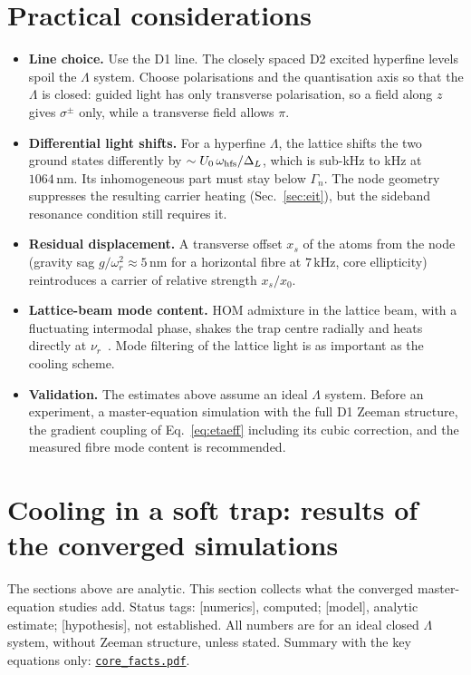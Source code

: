 \documentclass[11pt,a4paper]{article}
\newcommand{\SI}[2]{\ensuremath{#1\,\mathrm{#2}}}
\begin{document}
\section{Practical considerations}
\label{sec:practical}
\begin{itemize}
\item \textbf{Line choice.} Use the D1 line. The closely spaced D2 excited hyperfine levels spoil the $\Lambda$ system. Choose polarisations and the quantisation axis so that the $\Lambda$ is closed: guided light has only transverse polarisation, so a field along $z$ gives $\sigma^\pm$ only, while a transverse field allows $\pi$.
\item \textbf{Differential light shifts.} For a hyperfine $\Lambda$, the lattice shifts the two ground states differently by $\sim U_0\,\omega_{\rm hfs}/\Delta_L$, which is sub-kHz to kHz at \SI{1064}{nm}. Its inhomogeneous part must stay below $\Gamma_n$. The node geometry suppresses the resulting carrier heating (Sec.~\ref{sec:eit}), but the sideband resonance condition still requires it.
\item \textbf{Residual displacement.} A transverse offset $x_s$ of the atoms from the node (gravity sag $g/\omega_r^2\approx\SI{5}{nm}$ for a horizontal fibre at \SI{7}{kHz}, core ellipticity) reintroduces a carrier of relative strength $x_s/x_0$.
\item \textbf{Lattice-beam mode content.} HOM admixture in the lattice beam, with a fluctuating intermodal phase, shakes the trap centre radially and heats directly at $\nu_r$~\cite{savard1997}. Mode filtering of the lattice light is as important as the cooling scheme.
\item \textbf{Validation.} The estimates above assume an ideal $\Lambda$ system. Before an experiment, a master-equation simulation with the full D1 Zeeman structure, the gradient coupling of Eq.~\eqref{eq:etaeff} including its cubic correction, and the measured fibre mode content is recommended.
\end{itemize}

\section{Cooling in a soft trap: results of the converged simulations}
\label{sec:soft}\hypertarget{d:soft}{}
The sections above are analytic. This section collects what the converged master-equation studies add. Status tags: [numerics], computed; [model], analytic estimate; [hypothesis], not established. All numbers are for an ideal closed $\Lambda$ system, without Zeeman structure, unless stated. Summary with the key equations only: \href{core_facts.pdf}{\texttt{core\_facts.pdf}}.
\end{document}
